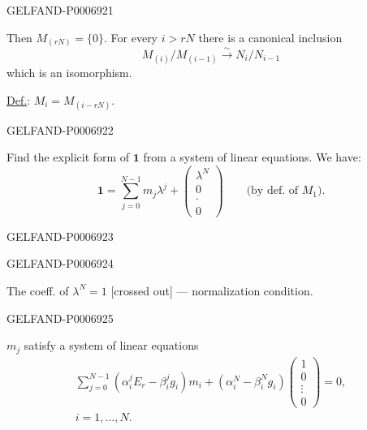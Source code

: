 \begin{GelfandAdjacentEvidence}{GELFAND-P000692}{1}

Then \(M_{(rN)}=\{0\}\). For every \(i>rN\) there is a canonical inclusion
\[
M_{(i)}/M_{(i-1)}\overset{\sim}{\longrightarrow}N_i/N_{i-1}
\]
which is an isomorphism.

\underline{Def.}: \(M_i=M_{(i-rN)}\).
\end{GelfandAdjacentEvidence}
\begin{GelfandAdjacentEvidence}{GELFAND-P000692}{2}


Find the explicit form of \(\mathbf1\) from a system of linear equations. We have:
\[
\mathbf{1}=\sum_{j=0}^{N-1}m_j\lambda^j+
\begin{pmatrix}\lambda^N\\0\\\cdot\\0\end{pmatrix}
\qquad\text{(by def. of \(M_1\)).}
\]
\end{GelfandAdjacentEvidence}
\begin{GelfandAdjacentEvidence}{GELFAND-P000692}{3}

\end{GelfandAdjacentEvidence}
\begin{GelfandAdjacentEvidence}{GELFAND-P000692}{4}

The coeff. of \(\lambda^N=1\) [crossed out] --- normalization condition.
\end{GelfandAdjacentEvidence}
\begin{GelfandAdjacentEvidence}{GELFAND-P000692}{5}


\(m_j\) satisfy a system of linear equations
\[
\begin{gathered}
\sum_{j=0}^{N-1}(\alpha_i^j E_r-\beta_i^j g_i)m_i+
(\alpha_i^N-\beta_i^N g_i)\begin{pmatrix}1\\0\\\vdots\\0\end{pmatrix}=0,\\
i=1,\ldots,N.
\end{gathered}
\]
\end{GelfandAdjacentEvidence}
